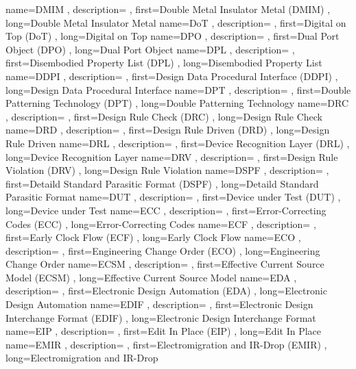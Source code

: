 { name={DMIM}
, description={}
, first={Double Metal Insulator Metal (DMIM)}
, long={Double Metal Insulator Metal}
}
{ name={DoT}
, description={}
, first={Digital on Top (DoT)}
, long={Digital on Top}
}
{ name={DPO}
, description={}
, first={Dual Port Object (DPO)}
, long={Dual Port Object}
}
{ name={DPL}
, description={}
, first={Disembodied Property List (DPL)}
, long={Disembodied Property List}
}
{ name={DDPI}
, description={}
, first={Design Data Procedural Interface (DDPI)}
, long={Design Data Procedural Interface}
}
{ name={DPT}
, description={}
, first={Double Patterning Technology (DPT)}
, long={Double Patterning Technology}
}
{ name={DRC}
, description={}
, first={Design Rule Check (DRC)}
, long={Design Rule Check}
}
{ name={DRD}
, description={}
, first={Design Rule Driven (DRD)}
, long={Design Rule Driven}
}
{ name={DRL}
, description={}
, first={Device Recognition Layer (DRL)}
, long={Device Recognition Layer}
}
{ name={DRV}
, description={}
, first={Design Rule Violation (DRV)}
, long={Design Rule Violation}
}
{ name={DSPF}
, description={}
, first={Detaild Standard Parasitic Format (DSPF)}
, long={Detaild Standard Parasitic Format}
}
{ name={DUT}
, description={}
, first={Device under Test (DUT)}
, long={Device under Test}
}
{ name={ECC}
, description={}
, first={Error-Correcting Codes (ECC)}
, long={Error-Correcting Codes}
}
{ name={ECF}
, description={}
, first={Early Clock Flow (ECF)}
, long={Early Clock Flow}
}
{ name={ECO}
, description={}
, first={Engineering Change Order (ECO)}
, long={Engineering Change Order}
}
{ name={ECSM}
, description={}
, first={Effective Current Source Model (ECSM)}
, long={Effective Current Source Model}
}
{ name={EDA}
, description={}
, first={Electronic Design Automation (EDA)}
, long={Electronic Design Automation}
}
{ name={EDIF}
, description={}
, first={Electronic Design Interchange Format (EDIF)}
, long={Electronic Design Interchange Format}
}
{ name={EIP}
, description={}
, first={Edit In Place (EIP)}
, long={Edit In Place}
}
{ name={EMIR}
, description={}
, first={Electromigration and IR-Drop (EMIR)}
, long={Electromigration and IR-Drop}
}
